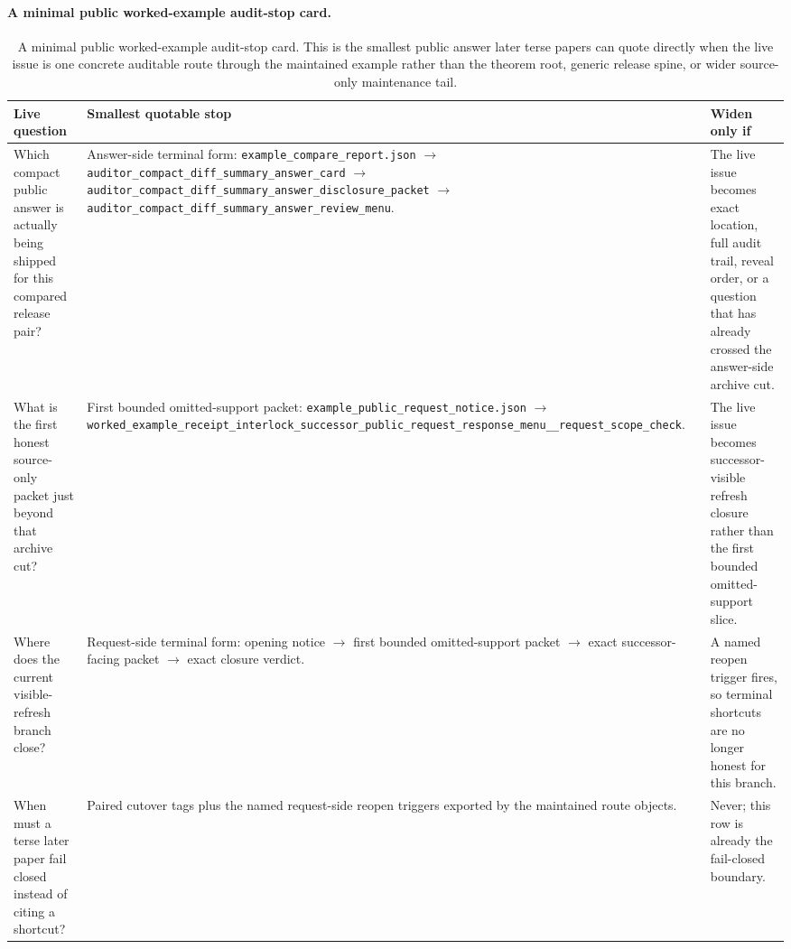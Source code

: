 \documentclass[11pt]{article}
\begin{document}
\paragraph{A minimal public worked-example audit-stop card.}
\begin{table}[t]
\centering
\small
\begin{tabularx}{\linewidth}{@{}lX X@{}}
\toprule
Live question & Smallest quotable stop & Widen only if \\
\midrule
Which compact public answer is actually being shipped for this compared release pair? & Answer-side terminal form: \nolinkurl{example_compare_report.json} $\to$ \texttt{auditor\_compact\_diff\_summary\_answer\_card} $\to$ \texttt{auditor\_compact\_diff\_summary\_answer\_disclosure\_packet} $\to$ \texttt{auditor\_compact\_diff\_summary\_answer\_review\_menu}. & The live issue becomes exact location, full audit trail, reveal order, or a question that has already crossed the answer-side archive cut. \\
What is the first honest source-only packet just beyond that archive cut? & First bounded omitted-support packet: \nolinkurl{example_public_request_notice.json} $\to$ \texttt{worked\_example\_receipt\_interlock\_successor\_public\_request\_response\_menu\_\_request\_scope\_check}. & The live issue becomes successor-visible refresh closure rather than the first bounded omitted-support slice. \\
Where does the current visible-refresh branch close? & Request-side terminal form: opening notice $\to$ first bounded omitted-support packet $\to$ exact successor-facing packet $\to$ exact closure verdict. & A named reopen trigger fires, so terminal shortcuts are no longer honest for this branch. \\
When must a terse later paper fail closed instead of citing a shortcut? & Paired cutover tags plus the named request-side reopen triggers exported by the maintained route objects. & Never; this row is already the fail-closed boundary. \\
\bottomrule
\end{tabularx}
\caption{A minimal public worked-example audit-stop card. This is the smallest public answer later terse papers can quote directly when the live issue is one concrete auditable route through the maintained example rather than the theorem root, generic release spine, or wider source-only maintenance tail.}
\label{tab:workedexample-mincard}
\end{table}
\end{document}
